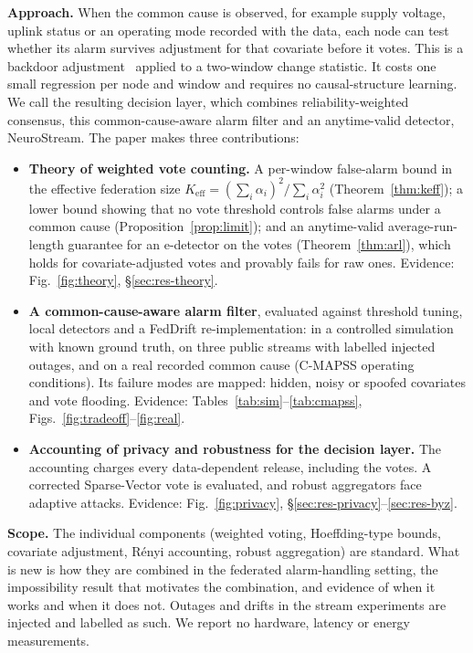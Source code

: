 \IfFileExists{IEEEtran.cls}{\documentclass[journal]{IEEEtran}\newcommand{\ieeemode}{}}{\documentclass[10pt,twocolumn,letterpaper]{article}\usepackage[margin=0.72in,columnsep=0.22in]{geometry}}
\newcommand{\Keff}{K_{\mathrm{eff}}}
\begin{document}
\noindent\textbf{Approach.} When the common cause is observed, for example supply voltage, uplink status or an operating mode recorded with the data, each node can test whether its alarm survives adjustment for that covariate before it votes. This is a backdoor adjustment~\cite{pearl2009causality} applied to a two-window change statistic. It costs one small regression per node and window and requires no causal-structure learning. We call the resulting decision layer, which combines reliability-weighted consensus, this common-cause-aware alarm filter and an anytime-valid detector, NeuroStream. The paper makes three contributions:
\begin{itemize}
\item[\textbf{C1}] \textbf{Theory of weighted vote counting.} A per-window false-alarm bound in the effective federation size $\Keff=(\sum_i\alpha_i)^2/\sum_i\alpha_i^2$ (Theorem~\ref{thm:keff}); a lower bound showing that no vote threshold controls false alarms under a common cause (Proposition~\ref{prop:limit}); and an anytime-valid average-run-length guarantee for an e-detector on the votes (Theorem~\ref{thm:arl}), which holds for covariate-adjusted votes and provably fails for raw ones. Evidence: Fig.~\ref{fig:theory}, \S\ref{sec:res-theory}.
\item[\textbf{C2}] \textbf{A common-cause-aware alarm filter}, evaluated against threshold tuning, local detectors and a FedDrift re-implementation: in a controlled simulation with known ground truth, on three public streams with labelled injected outages, and on a real recorded common cause (C-MAPSS operating conditions). Its failure modes are mapped: hidden, noisy or spoofed covariates and vote flooding. Evidence: Tables~\ref{tab:sim}--\ref{tab:cmapss}, Figs.~\ref{fig:tradeoff}--\ref{fig:real}.
\item[\textbf{C3}] \textbf{Accounting of privacy and robustness for the decision layer.} The accounting charges every data-dependent release, including the votes. A corrected Sparse-Vector vote is evaluated, and robust aggregators face adaptive attacks. Evidence: Fig.~\ref{fig:privacy}, \S\ref{sec:res-privacy}--\ref{sec:res-byz}.
\end{itemize}
\noindent\textbf{Scope.} The individual components (weighted voting, Hoeffding-type bounds, covariate adjustment, Rényi accounting, robust aggregation) are standard. What is new is how they are combined in the federated alarm-handling setting, the impossibility result that motivates the combination, and evidence of when it works and when it does not. Outages and drifts in the stream experiments are injected and labelled as such. We report no hardware, latency or energy measurements.
\end{document}
